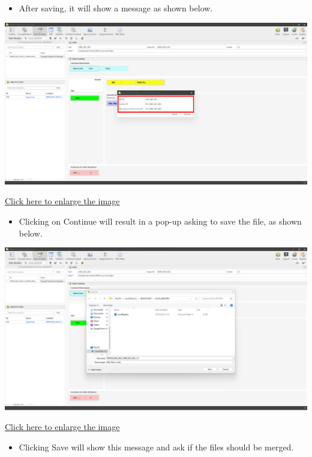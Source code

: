 \documentclass[
]{book}
\providecommand{\tightlist}{%
  \setlength{\itemsep}{0pt}\setlength{\parskip}{0pt}}
\begin{document}
\begin{itemize}
\tightlist
\item
  After saving, it will show a message as shown below.
\end{itemize}

\begin{center}\includegraphics[width=1\linewidth]{./images/image146} \end{center}

\href{images/image146.png}{Click here to enlarge the image}

\begin{itemize}
\tightlist
\item
  Clicking on Continue will result in a pop-up asking to save the file, as shown below.
\end{itemize}

\begin{center}\includegraphics[width=1\linewidth]{./images/image152} \end{center}

\href{images/image152.png}{Click here to enlarge the image}

\begin{itemize}
\tightlist
\item
  Clicking Save will show this message and ask if the files should be merged.
\end{itemize}
\end{document}

